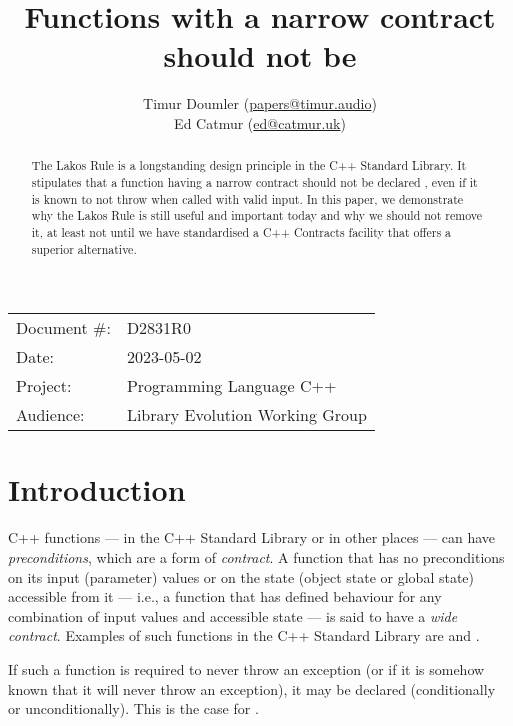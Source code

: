 


\title{Functions with a narrow contract should not be }
\author{ Timur Doumler \small(\href{mailto:papers@timur.audio}{papers@timur.audio})   \\
Ed Catmur \small(\href{mailto:ed@catmur.uk}{ed@catmur.uk})  }
\date{}
\maketitle

\begin{tabular}{ll}
Document \#: & D2831R0 \\
Date: &2023-05-02 \\
Project: & Programming Language C++ \\
Audience: & Library Evolution Working Group
\end{tabular}

\begin{abstract}
The Lakos Rule is a longstanding design principle in the C++ Standard Library. It stipulates that a function having a narrow contract should not be declared , even if it is known to not throw when called with valid input. In this paper, we demonstrate why the Lakos Rule is still useful and important today and why we should not remove it, at least not until we have standardised a C++ Contracts facility that offers a superior alternative.
\end{abstract}

\section{Introduction}
\label{sec:intro}

C++ functions --- in the C++ Standard Library or in other places --- can have \emph{preconditions}, which are a form of \emph{contract}. A function that has no preconditions on its input (parameter) values or on the state (object state or global state) accessible from it --- i.e., a function that has defined behaviour for any combination of input values and accessible state --- is said to have a \emph{wide contract}. Examples of such functions in the C++ Standard Library are  and .

If such a function is required to never throw an exception (or if it is somehow known that it will never throw an exception), it may be declared  (conditionally or unconditionally). This is the case for .

